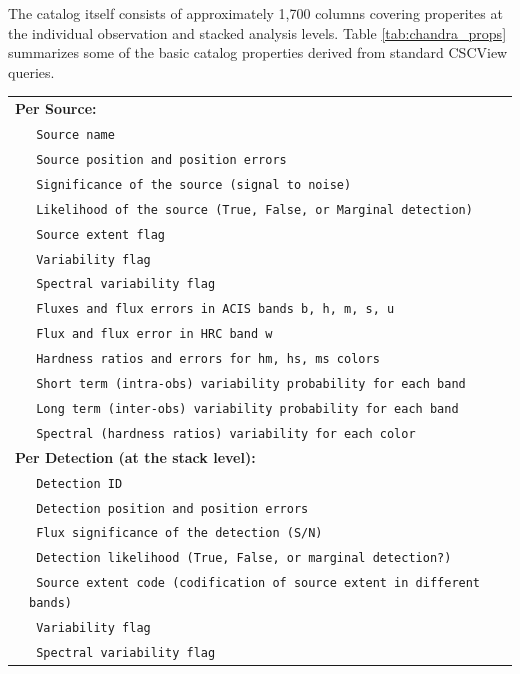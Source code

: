\documentclass[11pt,a4paper]{ivoa}
\begin{document}
\begin{itemize}
The catalog itself consists of approximately 1,700 columns covering properites at the individual observation and stacked analysis levels.
Table \ref{tab:chandra_props} summarizes some of the basic catalog properties derived from standard CSCView queries.

\begin{table}[ht!]
  \tiny
  \begin{tabular}{|p{0.4cm}p{10.0cm}|}
    \hline
    \multicolumn{2}{|l|}{\textbf{Per Source:}} \\
    & \texttt{ Source name } \\
    & \texttt{ Source position and position errors } \\
    & \texttt{ Significance of the source (signal to noise) } \\
    & \texttt{ Likelihood of the source  (True, False, or Marginal detection) } \\
    & \texttt{ Source extent flag } \\
    & \texttt{ Variability flag } \\
    & \texttt{ Spectral variability flag } \\
    & \texttt{ Fluxes and flux errors in ACIS bands b, h, m, s, u } \\
    & \texttt{ Flux and flux error in  HRC band w } \\
    & \texttt{ Hardness ratios and errors for hm, hs, ms colors } \\
    & \texttt{ Short term (intra-obs) variability probability for each band } \\
    & \texttt{ Long term (inter-obs) variability probability for each band } \\
    & \texttt{ Spectral (hardness ratios) variability for each color } \\
    \hline
    \multicolumn{2}{|l|}{\textbf{Per Detection (at the stack level):}} \\
    & \texttt{ Detection ID } \\
    & \texttt{ Detection position and position errors } \\
    & \texttt{ Flux significance of the detection (S/N) } \\
    & \texttt{ Detection likelihood (True, False, or marginal detection?) } \\
    & \texttt{ Source extent code (codification of source extent in different bands) } \\
    & \texttt{ Variability flag } \\
    & \texttt{ Spectral variability flag } \\

\end{tabular}
\end{table}
\end{itemize}
\end{document}
